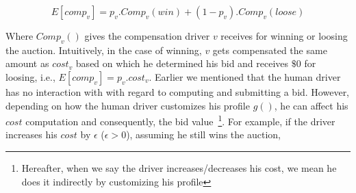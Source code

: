 \begin{equation*}
E[comp_v] = p_v.Comp_v(win) + (1 - p_v).Comp_v(loose)
\end{equation*}

Where $Comp_v()$ gives the compensation driver $v$ receives for winning or loosing the auction. Intuitively, in the case of winning, $v$ gets compensated the same amount as $cost_v$ based on which he determined his bid and receives $\$0$ for loosing, i.e., $E[comp_v] = p_v.cost_v$.
Earlier we mentioned that the human driver has no interaction with \fname with regard to computing and submitting a bid. However, depending on how the human driver customizes his profile $g()$, he can affect his $cost$ computation and consequently, the bid value~\footnote{Hereafter, when we say the driver increases/decreases his cost, we mean he does it indirectly by customizing his profile}. For example, if the driver increases his $cost$ by $\epsilon$ ($\epsilon > 0$), assuming he still wins the auction,  